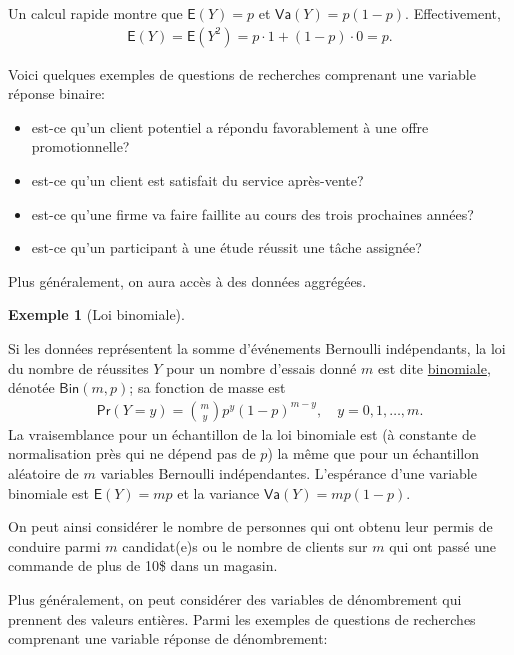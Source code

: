 \documentclass[
  11pt,
  letterpaper,
]{scrbook}
\providecommand{\tightlist}{%
  \setlength{\itemsep}{0pt}\setlength{\parskip}{0pt}}\usepackage{longtable,booktabs,array}
\theoremstyle{plain}
\theoremstyle{plain}
\theoremstyle{definition}
\newtheorem{example}{Exemple}[chapter]
\theoremstyle{definition}
\theoremstyle{remark}
\begin{document}
Un calcul rapide montre que \(\mathsf{E}(Y)=p\) et
\(\mathsf{Va}(Y)=p(1-p).\) Effectivement, \begin{align*}
\mathsf{E}(Y) = \mathsf{E}(Y^2) = p \cdot 1 + (1-p) \cdot 0 = p.
\end{align*}

Voici quelques exemples de questions de recherches comprenant une
variable réponse binaire:

\begin{itemize}
\tightlist
\item
  est-ce qu'un client potentiel a répondu favorablement à une offre
  promotionnelle?
\item
  est-ce qu'un client est satisfait du service après-vente?
\item
  est-ce qu'une firme va faire faillite au cours des trois prochaines
  années?
\item
  est-ce qu'un participant à une étude réussit une tâche assignée?
\end{itemize}

Plus généralement, on aura accès à des données aggrégées.

\begin{example}[Loi
binomiale]\protect\hypertarget{exm-loibinom}{}\label{exm-loibinom}

Si les données représentent la somme d'événements Bernoulli
indépendants, la loi du nombre de réussites \(Y\) pour un nombre
d'essais donné \(m\) est dite
\href{https://fr.wikipedia.org/wiki/Loi_binomiale}{binomiale}, dénotée
\(\mathsf{Bin}(m, p)\); sa fonction de masse est \begin{align*}
\mathsf{Pr}(Y=y) = \binom{m}{y}p^y (1-p)^{m-y}, \quad y=0, 1, \ldots, m.
\end{align*} La vraisemblance pour un échantillon de la loi binomiale
est (à constante de normalisation près qui ne dépend pas de \(p\)) la
même que pour un échantillon aléatoire de \(m\) variables Bernoulli
indépendantes. L'espérance d'une variable binomiale est
\(\mathsf{E}(Y)=mp\) et la variance \(\mathsf{Va}(Y)=mp(1-p).\)

\end{example}

On peut ainsi considérer le nombre de personnes qui ont obtenu leur
permis de conduire parmi \(m\) candidat(e)s ou le nombre de clients sur
\(m\) qui ont passé une commande de plus de 10\$ dans un magasin.

Plus généralement, on peut considérer des variables de dénombrement qui
prennent des valeurs entières. Parmi les exemples de questions de
recherches comprenant une variable réponse de dénombrement:
\end{document}
